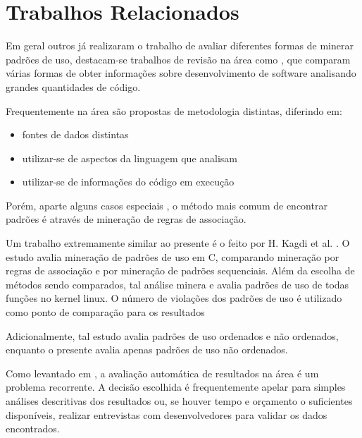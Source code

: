 \section{Trabalhos Relacionados}

Em geral outros já realizaram o trabalho de avaliar diferentes formas de minerar
padrões de uso, destacam-se trabalhos de revisão na área como
\cite{api_property_inference}
\cite{recommender_system_software_engineering_nearest_neighbours}, que comparam
várias formas de obter informações sobre desenvolvimento de software analisando
grandes quantidades de código.

Frequentemente na área são propostas de metodologia distintas, diferindo em:
\begin{itemize}
  \item fontes de dados distintas \cite{up_miner} %
  \item utilizar-se de aspectos da linguagem que analisam \cite{mapo}
  \item utilizar-se de informações do código em execução \cite{groums}
  \cite{focus}
\end{itemize}

Porém, aparte alguns casos especiais \cite{probabilistic_api_miner}
\cite{groums} \cite{prefix_span} \cite{focus}, o método mais comum de encontrar
padrões é através de mineração de regras de associação.

Um trabalho extremamente similar ao presente é o feito por H. Kagdi et al.
\cite{comp_mining_source_code}. O estudo avalia mineração de padrões de uso em
C, comparando mineração por regras de associação e por mineração de padrões
sequenciais. Além da escolha de métodos sendo comparados, tal análise minera e
avalia padrões de uso de todas funções no kernel linux. O número de violações
dos padrões de uso é utilizado como ponto de comparação para os resultados 

Adicionalmente, tal estudo avalia padrões de uso ordenados e não ordenados,
enquanto o presente avalia apenas padrões de uso não ordenados.

Como levantado em \cite{api_property_inference}
\cite{analyzing_temporal_api_usage_patterns}, a avaliação automática de
resultados na área é um problema recorrente. A decisão escolhida é
frequentemente apelar para simples análises descritivas dos resultados ou, se
houver tempo e orçamento o suficientes disponíveis, realizar entrevistas com
desenvolvedores para validar os dados encontrados. 
